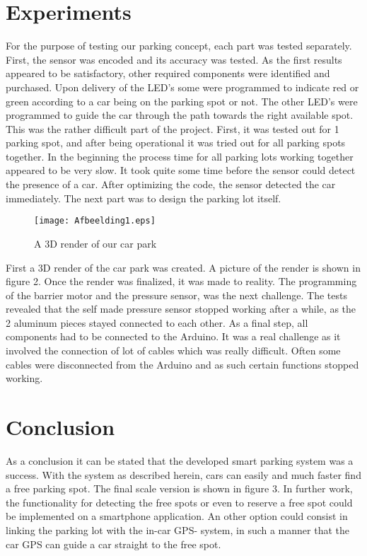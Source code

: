 \documentclass[10pt,twocolumn]{article}
\begin{document}
\section{Experiments}
For the purpose of testing our parking concept, each part was tested  separately. First, the sensor was  encoded and its accuracy was tested. As the first results appeared to be satisfactory, other required components were identified and purchased. Upon delivery of the LED’s some were programmed to indicate red or green according to a car being on the parking spot or not. The other LED’s were programmed to guide the car through the path towards the right available spot. This was the rather difficult part of the project.   First, it was tested out for 1 parking spot, and after being operational it was tried out for all parking spots together. In the beginning the process time for all parking lots working together appeared to be very slow. It took quite some time before the sensor could detect the presence of a car. After optimizing the code, the sensor detected the car immediately. The next part was to design the parking lot itself.


\begin{figure}[H]
\begin{center}

   \texttt{[image: Afbeelding1.eps]}
\end{center}
   \caption{A 3D render of our car park}
\label{fig:long}
\label{fig:onecol}
\end{figure}



First a 3D render of the car park was created. A picture of the render is shown in figure 2. Once the render was finalized, it was made to reality. The programming of the barrier motor and the pressure sensor, was the next challenge. The tests revealed that the self made pressure sensor stopped working after a while, as the 2 aluminum pieces stayed connected to each other. As a final step, all components had to be connected to the Arduino. It was a real challenge as it involved the connection of lot of cables which was really difficult. Often some cables were disconnected from the Arduino and as such certain functions stopped working.           
 
\section{Conclusion}
As a conclusion it can be stated that the developed smart parking system was a success. With the system as described herein, cars can easily and much faster find a free parking spot. The final scale version is shown in figure 3. In further work, the functionality for detecting the free spots or even to reserve a free spot could be implemented on a smartphone application. An other option could consist in linking the parking lot with the in-car GPS- system, in such a manner that the car GPS can guide a car straight to the free spot. 
\end{document}
